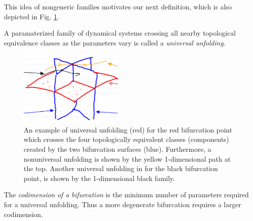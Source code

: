 This idea of nongeneric families motivates our next definition, which is also depicted in Fig. \ref{fig:univ_unfold_def}.
\begin{definition}
	A paramaterized family of dynamical systems crossing all nearby topological equivalence classes as the parameters vary is called a \emph{universal unfolding}.
\end{definition}
\begin{figure}[h!]
	\centering
	\includegraphics[width=0.45\textwidth]{figures/ch3/11univ_unfold_def.png}
	\caption{An example of universal unfolding (red) for the red bifurcation point which crosses the four topologically equivalent classes (components) created by the two bifurcation surfaces (blue). Furthermore, a nonuniversal unfolding is shown by the yellow 1-dimensional path at the top. Another universal unfolding in for the black bifurcation point, is shown by the 1-dimensional black family.}
	\label{fig:univ_unfold_def}
\end{figure}

\begin{definition} The \emph{codimension of a bifurcation} is the minimum number of parameters required for a universal unfolding. Thus a more degenerate bifurcation requires a larger codimension.
\end{definition}

